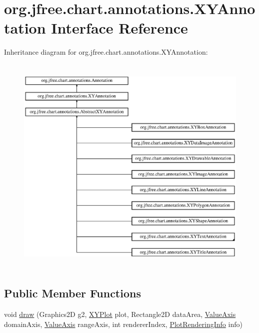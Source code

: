 \hypertarget{interfaceorg_1_1jfree_1_1chart_1_1annotations_1_1_x_y_annotation}{}\section{org.\+jfree.\+chart.\+annotations.\+X\+Y\+Annotation Interface Reference}
\label{interfaceorg_1_1jfree_1_1chart_1_1annotations_1_1_x_y_annotation}
Inheritance diagram for org.\+jfree.\+chart.\+annotations.\+X\+Y\+Annotation\+:\begin{figure}[H]
\begin{center}
\leavevmode
\includegraphics[height=10.803859cm]{interfaceorg_1_1jfree_1_1chart_1_1annotations_1_1_x_y_annotation}
\end{center}
\end{figure}
\subsection*{Public Member Functions}
\begin{DoxyCompactItemize}
\item 
void \mbox{\hyperlink{interfaceorg_1_1jfree_1_1chart_1_1annotations_1_1_x_y_annotation_ada5edc52b7dfbaa9ded956afe447b543}{draw}} (Graphics2D g2, \mbox{\hyperlink{classorg_1_1jfree_1_1chart_1_1plot_1_1_x_y_plot}{X\+Y\+Plot}} plot, Rectangle2D data\+Area, \mbox{\hyperlink{classorg_1_1jfree_1_1chart_1_1axis_1_1_value_axis}{Value\+Axis}} domain\+Axis, \mbox{\hyperlink{classorg_1_1jfree_1_1chart_1_1axis_1_1_value_axis}{Value\+Axis}} range\+Axis, int renderer\+Index, \mbox{\hyperlink{classorg_1_1jfree_1_1chart_1_1plot_1_1_plot_rendering_info}{Plot\+Rendering\+Info}} info)
\end{DoxyCompactItemize}


